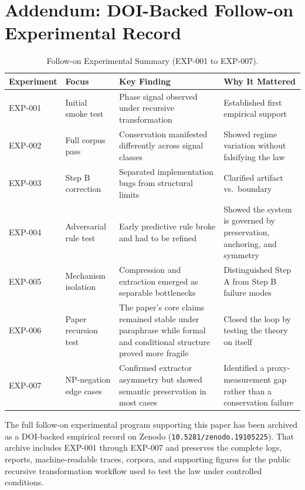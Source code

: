 \documentclass[11pt,a4paper]{article}
\begin{document}
\section*{Addendum: DOI-Backed Follow-on Experimental Record}

\begin{table}[htbp]
\centering
\small
\begin{tabular}{@{}p{1.4cm}p{3.2cm}p{4.8cm}p{4.8cm}@{}}
\toprule
\textbf{Experiment} & \textbf{Focus} & \textbf{Key Finding} & \textbf{Why It Mattered} \\
\midrule
EXP-001 & Initial smoke test & Phase signal observed under recursive transformation & Established first empirical support \\
EXP-002 & Full corpus pass & Conservation manifested differently across signal classes & Showed regime variation without falsifying the law \\
EXP-003 & Step B correction & Separated implementation bugs from structural limits & Clarified artifact vs.\ boundary \\
EXP-004 & Adversarial rule test & Early predictive rule broke and had to be refined & Showed the system is governed by preservation, anchoring, and symmetry \\
EXP-005 & Mechanism isolation & Compression and extraction emerged as separable bottlenecks & Distinguished Step A from Step B failure modes \\
EXP-006 & Paper recursion test & The paper's core claims remained stable under paraphrase while formal and conditional structure proved more fragile & Closed the loop by testing the theory on itself \\
EXP-007 & NP-negation edge cases & Confirmed extractor asymmetry but showed semantic preservation in most cases & Identified a proxy-measurement gap rather than a conservation failure \\
\bottomrule
\end{tabular}
\caption{Follow-on Experimental Summary (EXP-001 to EXP-007).}
\label{tab:exp-summary}
\end{table}

The full follow-on experimental program supporting this paper has been archived as a DOI-backed empirical record on Zenodo (\texttt{10.5281/zenodo.19105225}). That archive includes EXP-001 through EXP-007 and preserves the complete logs, reports, machine-readable traces, corpora, and supporting figures for the public recursive transformation workflow used to test the law under controlled conditions.
\end{document}
